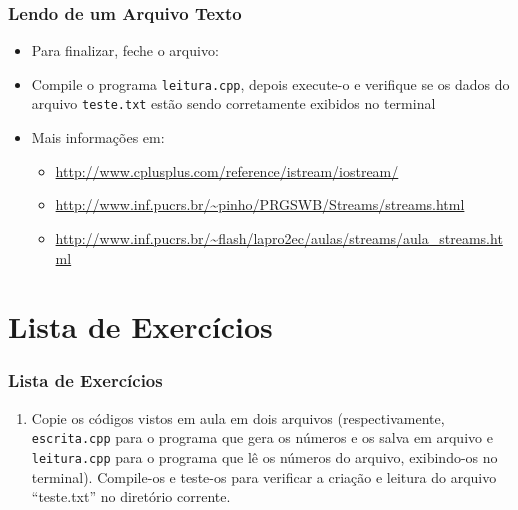 \documentclass[aspectratio=169]{beamer}
\newcommand\setItemnumber[1]{\setcounter{enumi}{\numexpr#1-1\relax}}
\begin{document}
\begin{frame}[fragile]\frametitle{Lendo de um Arquivo Texto}
\begin{itemize}
	\item Para finalizar, feche o arquivo:

	\item Compile o programa \texttt{leitura.cpp}, depois execute-o e verifique se os dados do arquivo \texttt{teste.txt} estão sendo corretamente exibidos no terminal
	\item Mais informações em:
	\begin{itemize}
		\item \url{http://www.cplusplus.com/reference/istream/iostream/}
		\item \url{http://www.inf.pucrs.br/~pinho/PRGSWB/Streams/streams.html}
		\item \url{http://www.inf.pucrs.br/~flash/lapro2ec/aulas/streams/aula_streams.html}
	\end{itemize}
\end{itemize}
\end{frame}

\section{Lista de Exercícios}

\begin{frame}\frametitle{Lista de Exercícios}
\begin{enumerate}
	\setItemnumber{1}
	\item Copie os códigos vistos em aula em dois arquivos (respectivamente, \texttt{escrita.cpp} para o programa que gera os números e os salva em arquivo e \texttt{leitura.cpp} para o programa que lê os números do arquivo, exibindo-os no terminal). Compile-os e teste-os para verificar a criação e leitura do arquivo ``teste.txt'' no diretório corrente.
\end{enumerate}
\end{frame}
\end{document}
